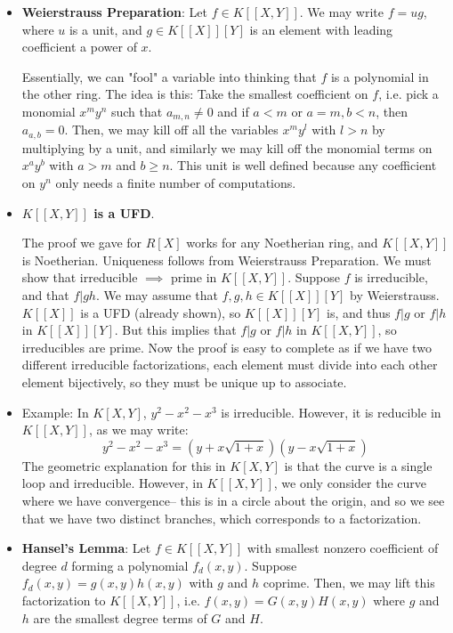 \documentclass[11pt, oneside]{amsart}   	%
\theoremstyle{definition}
\begin{document}
\begin{itemize}
	\item \textbf{Weierstrauss Preparation}: Let $f\in K[[X, Y]]$. We may write $f = ug$, where $u$ is a unit, and $g\in K[[X]][Y]$ is an element with 
	leading coefficient a power of $x$. 
	
	Essentially, we can "fool" a variable into thinking that $f$ is a polynomial in the other ring. The idea is this: Take the smallest coefficient on $f$, 
	i.e. pick a monomial $x^my^n$ such that $a_{m, n} \neq 0$ and if $a < m$ or $a = m, b < n$, then $a_{a, b} = 0$. Then, we may kill off 
	all the variables $x^my^l$ with $l > n$ by multiplying by a unit, and similarly we may kill off the monomial terms on $x^ay^b$ with $a > m$ and 
	$b \geq n$. This unit is well defined because any coefficient on $y^n$ only needs a finite number of computations.
	
	\item \textbf{$K[[X, Y]]$ is a UFD}. 
	
	The proof we gave for $R[X]$ works for any Noetherian ring, and $K[[X, Y]]$ is Noetherian. Uniqueness follows from Weierstrauss Preparation. 
	We must show that irreducible $\implies$ prime in $K[[X, Y]]$. Suppose $f$ is irreducible, and that $f | gh$. We may assume that $f, g, h\in 
	K[[X]][Y]$ by Weierstrauss. $K[[X]]$ is a UFD (already shown), so $K[[X]][Y]$ is, and thus $f | g$ or $f | h$ in $K[[X]][Y]$. But this implies that 
	$f | g$ or $f | h$ in $K[[X, Y]]$, so irreducibles are prime. Now the proof is easy to complete as if we have two different irreducible factorizations, 
	each element must divide into each other element bijectively, so they must be unique up to associate. 
	
	\item Example: In $K[X, Y]$, $y^2 - x^2 - x^3$ is irreducible. However, it is reducible in $K[[X, Y]]$, as we may write:
	$$
		y^2 - x^2 - x^3 = (y + x\sqrt{1 + x})(y - x\sqrt{1 + x})
	$$
	The geometric explanation for this in $K[X, Y]$ is that the curve is a single loop and irreducible. However, in $K[[X, Y]]$, we only consider the curve 
	where we have convergence-- this is in a circle about the origin, and so we see that we have two distinct branches, which corresponds to a 
	factorization. 
	
	\item \textbf{Hansel's Lemma}: Let $f\in K[[X, Y]]$ with smallest nonzero coefficient of degree $d$ forming a polynomial $f_d(x, y)$. Suppose 
	$f_d(x, y) = g(x, y)h(x, y)$ with $g$ and $h$ coprime. Then, we may lift this factorization to $K[[X, Y]]$, i.e. $f(x, y) = G(x, y)H(x, y)$ where $g$ and 
	$h$ are the smallest degree terms of $G$ and $H$. 
	

\end{itemize}
\end{document}
